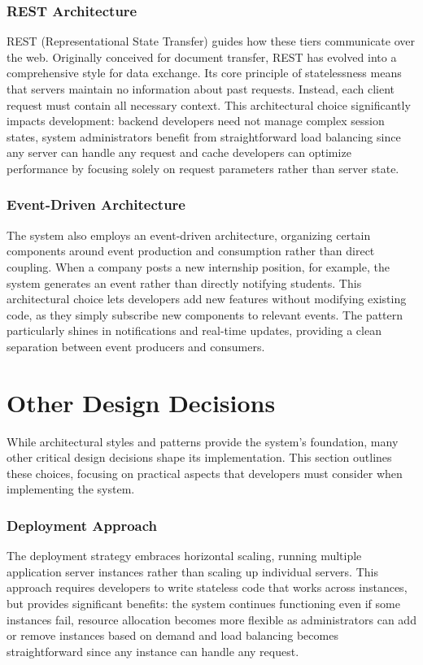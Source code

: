 \subsubsection{REST Architecture}
REST (Representational State Transfer) guides how these tiers communicate over the web.
Originally conceived for document transfer, REST has evolved into a comprehensive style for data exchange.
Its core principle of statelessness means that servers maintain no information about past requests.
Instead, each client request must contain all necessary context.
This architectural choice significantly impacts development: backend developers need not manage complex session states, system administrators benefit from straightforward load balancing since any server can handle any request and cache developers can optimize performance by focusing solely on request parameters rather than server state.

\subsubsection{Event-Driven Architecture}
The system also employs an event-driven architecture, organizing certain components around event production and consumption rather than direct coupling.
When a company posts a new internship position, for example, the system generates an event rather than directly notifying students.
This architectural choice lets developers add new features without modifying existing code, as they simply subscribe new components to relevant events.
The pattern particularly shines in notifications and real-time updates, providing a clean separation between event producers and consumers.

\section{Other Design Decisions}
While architectural styles and patterns provide the system's foundation, many other critical design decisions shape its implementation.
This section outlines these choices, focusing on practical aspects that developers must consider when implementing the system.

\subsubsection{Deployment Approach}
The deployment strategy embraces horizontal scaling, running multiple application server instances rather than scaling up individual servers.
This approach requires developers to write stateless code that works across instances, but provides significant benefits: the system continues functioning even if some instances fail, resource allocation becomes more flexible as administrators can add or remove instances based on demand and load balancing becomes straightforward since any instance can handle any request.

